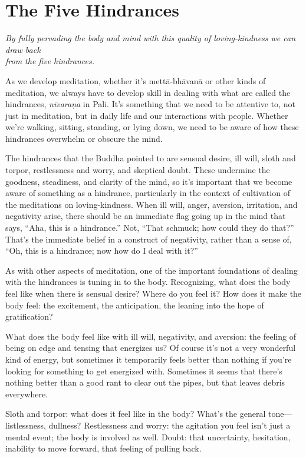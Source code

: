 \chapter{The Five Hindrances}

\epigraph{\emph{By fully pervading the body and mind with this quality
of loving-kindness we can draw back\\from the five hindrances.}}{}

As we develop meditation, whether it’s mettā-bhāvanā or other kinds of
meditation, we always have to develop skill in dealing with what are
called the hindrances, \emph{nīvaraṇa} in Pali. It’s something that we
need to be attentive to, not just in meditation, but in daily life and
our interactions with people. Whether we’re walking, sitting, standing,
or lying down, we need to be aware of how these hindrances overwhelm or
obscure the mind.

The hindrances that the Buddha pointed to are sensual desire, ill will,
sloth and torpor, restlessness and worry, and skeptical doubt. These
undermine the goodness, steadiness, and clarity of the mind, so it’s
important that we become aware of something as a hindrance, particularly
in the context of cultivation of the meditations on loving-kindness.
When ill will, anger, aversion, irritation, and negativity arise, there
should be an immediate flag going up in the mind that says, “Aha, this
is a hindrance.” Not, “That schmuck; how could they do that?” That’s the
immediate belief in a construct of negativity, rather than a sense of,
“Oh, this is a hindrance; now how do I deal with it?”

As with other aspects of meditation, one of the important foundations of
dealing with the hindrances is tuning in to the body. Recognizing, what
does the body feel like when there is sensual desire? Where do you feel
it? How does it make the body feel: the excitement, the anticipation,
the leaning into the hope of gratification?

What does the body feel like with ill will, negativity, and aversion:
the feeling of being on edge and tensing that energizes us? Of course
it’s not a very wonderful kind of energy, but sometimes it temporarily
feels better than nothing if you’re looking for something to get
energized with. Sometimes it seems that there’s nothing better than a
good rant to clear out the pipes, but that leaves debris everywhere.

Sloth and torpor: what does it feel like in the body? What’s the general
tone—listlessness, dullness? Restlessness and worry: the agitation you
feel isn’t just a mental event; the body is involved as well. Doubt:
that uncertainty, hesitation, inability to move forward, that feeling of
pulling back.

